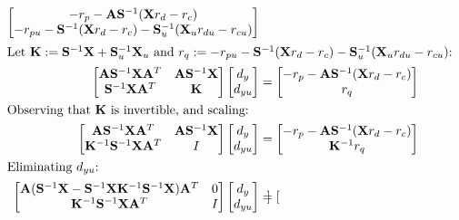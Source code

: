 \documentclass[10pt,a4paper]{article}
\begin{document}
\begin{align*}
\begin{bmatrix}
	-r_p - \mathbf{A}\mathbf{S}^{-1}(\mathbf{X}r_d - r_c) \\
	-r_{pu} - \mathbf{S}^{-1}(\mathbf{X}r_d - r_c) - \mathbf{S}_u^{-1}(\mathbf{X}_ur_{du} - r_{cu})
\end{bmatrix} \\
\intertext{Let $\mathbf{K} := \mathbf{S}^{-1}\mathbf{X}+\mathbf{S}_u^{-1}\mathbf{X}_u$ and $r_q := -r_{pu} - \mathbf{S}^{-1}(\mathbf{X}r_d - r_c) - \mathbf{S}_u^{-1}(\mathbf{X}_ur_{du} - r_{cu})$:}
\begin{bmatrix}
	\mathbf{A}\mathbf{S}^{-1}\mathbf{X}\mathbf{A}^T & \mathbf{A}\mathbf{S}^{-1}\mathbf{X} \\
	\mathbf{S}^{-1}\mathbf{X}\mathbf{A}^T & \mathbf{K}
\end{bmatrix}
\begin{bmatrix}d_y \\ d_{yu}\end{bmatrix} &=
\begin{bmatrix}
	-r_p - \mathbf{A}\mathbf{S}^{-1}(\mathbf{X}r_d - r_c) \\
	r_q
\end{bmatrix} \\
\intertext{Observing that $\mathbf{K}$ is invertible, and scaling:}
\begin{bmatrix}
	\mathbf{A}\mathbf{S}^{-1}\mathbf{X}\mathbf{A}^T & \mathbf{A}\mathbf{S}^{-1}\mathbf{X} \\
	\mathbf{K}^{-1}\mathbf{S}^{-1}\mathbf{X}\mathbf{A}^T & I
\end{bmatrix}
\begin{bmatrix}d_y \\ d_{yu}\end{bmatrix} &=
\begin{bmatrix}
	-r_p - \mathbf{A}\mathbf{S}^{-1}(\mathbf{X}r_d - r_c) \\
	\mathbf{K}^{-1}r_q
\end{bmatrix} \\
\intertext{Eliminating $d_{yu}$:}
\begin{bmatrix}
	\mathbf{A}(\mathbf{S}^{-1}\mathbf{X} - \mathbf{S}^{-1}\mathbf{X}\mathbf{K}^{-1}\mathbf{S}^{-1}\mathbf{X})\mathbf{A}^T & 0 \\
	\mathbf{K}^{-1}\mathbf{S}^{-1}\mathbf{X}\mathbf{A}^T & I
\end{bmatrix}
\begin{bmatrix}d_y \\ d_{yu}\end{bmatrix} &=
\begin{bmatrix}

\end{bmatrix}
\end{align*}
\end{document}
